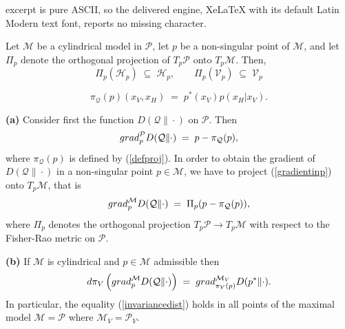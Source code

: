 \documentclass[10pt,a4paper]{amsart}
\begin{document}
excerpt is pure ASCII, so the delivered engine, XeLaTeX with its default Latin Modern text font, reports no missing character.
\begin{lemma} \label{invcylind}
Let ${\mathcal M}$ be a cylindrical model in ${\mathcal P}$, let $p$ be a non-singular point of ${\mathcal M}$, and let $\Pi_p$ denote the orthogonal projection of $T_p {\mathcal P}$ onto $T_p {\mathcal M}$. 
Then,  
\begin{equation*}
   \Pi_p ({\mathcal H}_p) 
   \; \subseteq \; {\mathcal H}_p, \qquad 
    \Pi_p ({\mathcal V}_p) 
    \; \subseteq \; {\mathcal V}_p
\end{equation*}
\end{lemma}

\begin{equation} \label{defproj}
   \pi_{\mathcal Q}(p)(x_V, x_H)  \; = \; p^\ast(x_V) p(x_H | x_V).  
\end{equation}

\begin{theorem} \label{graddeppr}
{\bf (a)} Consider first the function $D({\mathcal Q} \| \cdot )$ on ${\mathcal P}$. Then  
\begin{equation} \label{gradientinp}
     {\rm grad}^{\mathcal P}_p  D({\mathcal Q} \| \cdot ) \; = \; p - \pi_{\mathcal Q}(p), 
\end{equation}
where $\pi_{\mathcal Q}(p)$ is defined by (\ref{defproj}).
In order to obtain the gradient of 
$D({\mathcal Q} \| \cdot )$ in a non-singular point $p \in {\mathcal M}$, we have to project (\ref{gradientinp}) onto $T_p {\mathcal M}$, that is 
\begin{equation} \label{gradientOnModel}
     {\rm grad}^{\mathcal M}_p  D({\mathcal Q} \| \cdot )  \; = \; \Pi_p (p - \pi_{\mathcal Q}(p)), 
\end{equation}
where $\Pi_p$ denotes the orthogonal projection $T_p{\mathcal P} \to T_p {\mathcal M}$ with respect to the Fisher-Rao metric on ${\mathcal P}$.
\smallskip

\noindent
{\bf (b)} If ${\mathcal M}$ is cylindrical and $p \in {\mathcal M}$ admissible then 
\begin{equation} \label{invariancedist}
  d\pi_V \left( {\rm grad}^{\mathcal M}_p  D({\mathcal Q} \| \cdot ) \right) 
  \; = \; {\rm grad}^{{\mathcal M}_V}_{\pi_V(p)}  D(p^\ast \| \cdot ).
\end{equation} 
In particular, the equality (\ref{invariancedist}) holds in all points of the maximal model ${\mathcal M} = {\mathcal P}$ where ${\mathcal M}_V = {\mathcal P}_V$. 
\end{theorem}
\end{document}
